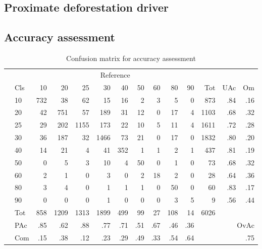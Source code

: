 		\subsection{Proximate deforestation driver}
		\label{subsec:proxy_deforestation_driver}

		\subsection{Accuracy assessment}
		\label{subsec:accuracy_assessment}
			\begin{table}[ht]
				\centering
				\caption[Accuracy assessment]{Confusion matrix for accuracy assessment}
				\label{tab:accuracy}
				\begin{tabular}{llrrrrrrrrrrrr}
					\hline
					& & \multicolumn{9}{c}{Reference} & & & \\
					& Cls & 10 & 20 & 25 & 30 & 40 & 50 & 60 & 80 & 90 & Tot & UAc & Om \\\hline
					\multirow{9}{*}{\STAB{\rotatebox[origin=c]{90}{Prediction}}}
					& 10 & 732 & 38 & 62 & 15 & 16 & 2 & 3 & 5 & 0 & 873 & .84 & .16 \\ 
					& 20 & 42 & 751 & 57 & 189 & 31 & 12 & 0 & 17 & 4 & 1103 & .68 & .32 \\ 
					& 25 & 29 & 202 & 1155 & 173 & 22 & 10 & 5 & 11 & 4 & 1611 & .72 & .28 \\ 
					& 30 & 36 & 187 & 32 & 1466 & 73 & 21 & 0 & 17 & 0 & 1832 & .80 & .20 \\ 
					& 40 & 14 & 21 & 4 & 41 & 352 & 1 & 1 & 2 & 1 & 437 & .81 & .19 \\ 
					& 50 & 0 & 5 & 3 & 10 & 4 & 50 & 0 & 1 & 0 & 73 & .68 & .32 \\ 
					& 60 & 2 & 1 & 0 & 3 & 0 & 2 & 18 & 2 & 0 & 28 & .64 & .36 \\ 
					& 80 & 3 & 4 & 0 & 1 & 1 & 1 & 0 & 50 & 0 & 60 & .83 & .17 \\ 
					& 90 & 0 & 0 & 0 & 1 & 0 & 0 & 0 & 3 & 5 & 9 & .56 & .44 \\\hline 
					& Tot & 858 & 1209 & 1313 & 1899 & 499 & 99 & 27 & 108 & 14 & 6026 & & \\
					& PAc & .85 & .62 & .88 & .77 & .71 & .51 & .67 & .46 & .36 & & \multicolumn{2}{r}{OvAc} \\
					& Com & .15 & .38 & .12 & .23 & .29 & .49 & .33 & .54 & .64 & & \multicolumn{2}{r}{.75} \\ \hline
				\end{tabular}
			\end{table}

